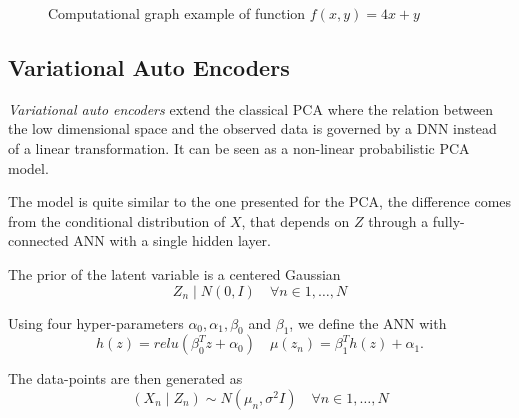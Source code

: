 \begin{figure}[H]
  \centering
  \caption{Computational graph example of function \(f(x,y) = 4x + y\) }\label{fig:cnn_cg}
\end{figure}

\subsection{Variational Auto Encoders}

\emph{Variational auto encoders} extend the classical PCA where the relation between the low dimensional space and the observed data is governed by a DNN instead of a linear transformation.
It can be seen as a non-linear probabilistic PCA model.

The model is quite similar to the one presented for the PCA, the difference comes from the conditional distribution of \(X\), that depends on \(Z\) through a fully-connected ANN with a single hidden layer.

The prior of the latent variable is a centered Gaussian
\[
  Z_{n} \mid N(0,I) \quad \forall n \in 1,\dots,N
\]

Using four hyper-parameters \(\alpha_{0}, \alpha_{1}, \beta_{0}\) and \(\beta_{1}\), we define the ANN with
\[
  h(z) = relu(\beta_{0}^{T}z + \alpha_{0}) \quad \mu(z_{n}) = \beta_{1}^{T}h(z) + \alpha_{1}.
\]

The data-points are then generated as
\[
  (X_{n}\mid Z_{n}) \sim N(\mu_{n}, \sigma^{2}I) \quad \forall n \in 1,\dots,N
\]
